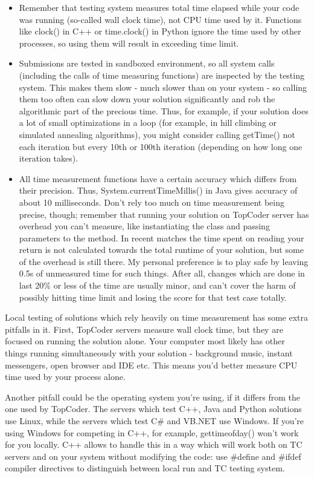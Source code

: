 \begin{itemize}
\item
  Remember that testing system measures total time elapsed while your
  code was running (so-called wall clock time), not CPU time used by it.
  Functions like clock() in C++ or time.clock() in Python ignore the
  time used by other processes, so using them will result in exceeding
  time limit.
\item
  Submissions are tested in sandboxed environment, so all system calls
  (including the calls of time measuring functions) are inspected by the
  testing system. This makes them slow - much slower than on your system
  - so calling them too often can slow down your solution significantly
  and rob the algorithmic part of the precious time. Thus, for example,
  if your solution does a lot of small optimizations in a loop (for
  example, in hill climbing or simulated annealing algorithms), you
  might consider calling getTime() not each iteration but every 10th or
  100th iteration (depending on how long one iteration takes).
\item
  All time measurement functions have a certain accuracy which differs
  from their precision. Thus, System.currentTimeMillis() in Java gives
  accuracy of about 10 milliseconds. Don't rely too much on time
  measurement being precise, though; remember that running your solution
  on TopCoder server has overhead you can't measure, like instantiating
  the class and passing parameters to the method. In recent matches the
  time spent on reading your return is not calculated towards the total
  runtime of your solution, but some of the overhead is still there. My
  personal preference is to play safe by leaving 0.5s of unmeasured time
  for such things. After all, changes which are done in last 20\% or
  less of the time are usually minor, and can't cover the harm of
  possibly hitting time limit and losing the score for that test case
  totally.
\end{itemize}

Local testing of solutions which rely heavily on time measurement has
some extra pitfalls in it. First, TopCoder servers measure wall clock
time, but they are focused on running the solution alone. Your computer
most likely has other things running simultaneously with your solution -
background music, instant messengers, open browser and IDE etc. This
means you'd better measure CPU time used by your process alone.

Another pitfall could be the operating system you're using, if it
differs from the one used by TopCoder. The servers which test C++, Java
and Python solutions use Linux, while the servers which test C\# and
VB.NET use Windows. If you're using Windows for competing in C++, for
example, gettimeofday() won't work for you locally. C++ allows to handle
this in a way which will work both on TC servers and on your system
without modifying the code: use \#define and \#ifdef compiler directives
to distinguish between local run and TC testing system.

